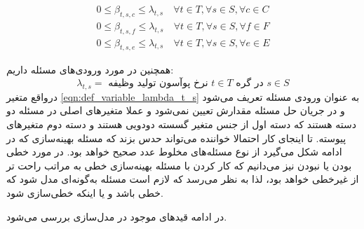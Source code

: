 	\begin{subequations}\label{eqn:def_variable_beta}
		\begin{align}
		0 \le \beta_{t,s,c} \le \lambda_{t,s}  \quad \forall{t \in T}, \forall{s \in S}, \forall{c \in C} \\
		0 \le \beta_{t,s,f} \le \lambda_{t,s}  \quad \forall{t \in T}, \forall{s \in S}, \forall{f \in F} \\
		0 \le \beta_{t,s,e} \le \lambda_{t,s}  \quad \forall{t \in T}, \forall{s \in S}, \forall{e \in E}
		\end{align}
	\end{subequations}
 
		همچنین در مورد ورودی‌های مسئله داریم:
	\begin{equation}\label{eqn:def_variable_lambda_t_s}
	\lambda_{t,s} = \text{ نرخ پوآسون تولید وظیفه $t \in T$ در گره $s \in S$}
	\end{equation}
	درواقع متغیر \cref{eqn:def_variable_lambda_t_s} به عنوان ورودی مسئله تعریف می‌شود و در جریان حل مسئله مقدارش تعیین نمی‌شود و عملا متغیرهای اصلی در مسئله دو دسته هستند که دسته اول از جنس متغیر گسسته دودویی هستند و دسته دوم متغیرهای پیوسته. تا اینجای کار احتمالا خواننده می‌تواند حدس بزند که مسئله بهینه‌سازی که در ادامه شکل می‌گیرد از نوع مسئله‌های مخلوط عدد صحیح  خواهد بود. در مورد خطی بودن یا نبودن نیز می‌دانیم که کار کردن با مسئله بهینه‌سازی خطی به مراتب راحت تر از غیرخطی خواهد بود، لذا به نظر می‌رسد که لازم است مسئله به‌گونه‌ای مدل شود که خطی باشد و یا اینکه خطی‌سازی شود. 
	
	در ادامه قیدهای موجود در مدل‌سازی بررسی می‌شود. 
